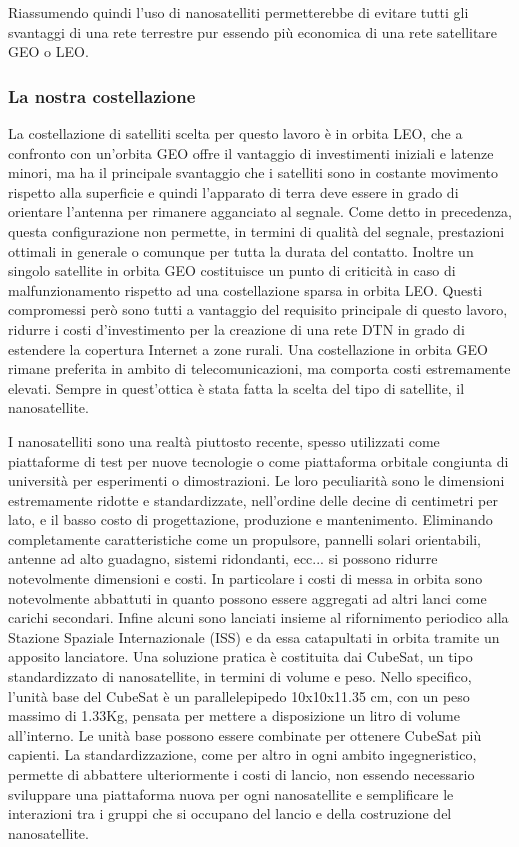 \documentclass[a4paper]{article}
\begin{document}
		Riassumendo quindi l'uso di nanosatelliti permetterebbe di evitare tutti gli svantaggi di una rete terrestre pur essendo più economica di una rete satellitare GEO o LEO. 
		
		\subsubsection{La nostra costellazione}
		La costellazione di satelliti scelta per questo lavoro è in orbita LEO, che a confronto con un'orbita GEO offre il vantaggio di investimenti iniziali e latenze minori, ma ha il principale svantaggio che i satelliti sono in costante movimento rispetto alla superficie e quindi l'apparato di terra deve essere in grado di orientare l'antenna per rimanere agganciato al segnale. Come detto in precedenza, questa configurazione non permette, in termini di qualità del segnale, prestazioni ottimali in generale o comunque per tutta la durata del contatto. Inoltre un singolo satellite in orbita GEO costituisce un punto di criticità in caso di malfunzionamento rispetto ad una costellazione sparsa in orbita LEO. Questi compromessi però sono tutti a vantaggio del requisito principale di questo lavoro, ridurre i costi d'investimento per la creazione di una rete DTN in grado di estendere la copertura Internet a zone rurali. Una costellazione in orbita GEO rimane preferita in ambito di telecomunicazioni, ma comporta costi estremamente elevati. Sempre in quest'ottica è stata fatta la scelta del tipo di satellite, il nanosatellite.
		
		I nanosatelliti sono una realtà piuttosto recente, spesso utilizzati come piattaforme di test per nuove tecnologie o come piattaforma orbitale congiunta di università per esperimenti o dimostrazioni. Le loro peculiarità sono le dimensioni estremamente ridotte e standardizzate, nell'ordine delle decine di centimetri per lato, e il basso costo di progettazione, produzione e mantenimento. Eliminando completamente caratteristiche come un propulsore, pannelli solari orientabili, antenne ad alto guadagno, sistemi ridondanti, ecc... si possono ridurre notevolmente dimensioni e costi. In particolare i costi di messa in orbita sono notevolmente abbattuti in quanto possono essere aggregati ad altri lanci come carichi secondari. Infine alcuni sono lanciati insieme al rifornimento periodico alla Stazione Spaziale Internazionale (ISS) e da essa catapultati in orbita tramite un apposito lanciatore. 
		Una soluzione pratica è costituita dai CubeSat, un tipo standardizzato di nanosatellite, in termini di volume e peso. Nello specifico, l'unità base del CubeSat è un parallelepipedo 10x10x11.35 cm, con un peso massimo di 1.33Kg, pensata per mettere a disposizione un litro di volume all'interno. Le unità base possono essere combinate per ottenere CubeSat più capienti. La standardizzazione, come per altro in ogni ambito ingegneristico, permette di abbattere ulteriormente i costi di lancio, non essendo necessario sviluppare una piattaforma nuova per ogni nanosatellite e semplificare le interazioni tra i gruppi che si occupano del lancio e della costruzione del nanosatellite.
		
\end{document}
